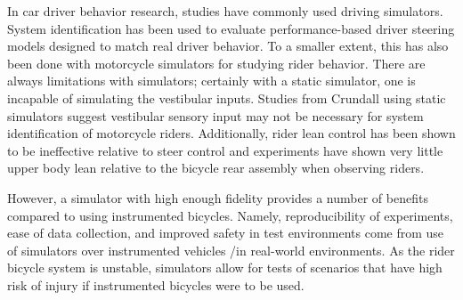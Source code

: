 \documentclass[11pt,a4paper,reqno]{amsart}
\begin{document}
In car driver behavior research, studies have commonly used driving simulators\cite{steen2011}.
System identification has been used to evaluate performance-based driver steering models designed to match real driver
behavior\cite{pilutti1999,steen2011}.
To a smaller extent, this has also been done with motorcycle simulators for studying rider behavior\cite{kovacsova2015}.
There are always limitations with simulators;
certainly with a static simulator, one is incapable of simulating the vestibular inputs.
Studies from Crundall using static simulators suggest vestibular sensory input may not be necessary for system
identification of motorcycle riders\cite{crundall2012}.
Additionally, rider lean control has been shown to be ineffective relative to steer control\cite{sharp2008}
and experiments have shown very little upper body lean relative to the bicycle rear assembly when observing
riders\cite{kooijman2009}.

However, a simulator with high enough fidelity provides a number of benefits compared to using instrumented bicycles.
Namely, reproducibility of experiments, ease of data collection, and improved safety in test environments
come from use of simulators over instrumented vehicles /in real-world environments\cite{dewinter2012}.
As the rider bicycle system is unstable, simulators allow for tests of scenarios that have high risk of injury if
instrumented bicycles were to be used.
\end{document}
